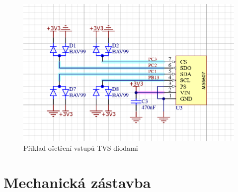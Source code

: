 \documentclass[twoside]{ctuthesis}
\theoremstyle{plain}
\theoremstyle{definition}
\theoremstyle{note}
\begin{document}
			\begin{figure}
				\centering
				\includegraphics[width = .7\textwidth]{Figures/osetreni_vstupu.png}
				\caption{Příklad ošetření vstupů TVS diodami}
				\label{fig:osetreni:vstupu}
			\end{figure}










	\section{Mechanická zástavba}
\end{document}
